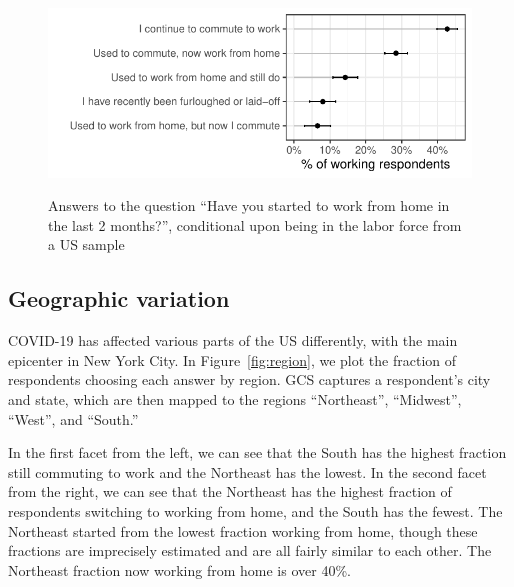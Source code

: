\documentclass[12pt]{article}
\begin{document}
\begin{figure}
  \caption{Answers to the question ``Have you started to work from home in the last 2 months?'', conditional upon being in the labor force from a US sample} \label{fig:working_summary}
\centering
\begin{minipage}{1.1 \linewidth}
  \includegraphics[width = \linewidth]{plots/working_summary.pdf} \\
  \begin{footnotesize}
    \end{footnotesize}
\end{minipage}
\end{figure} 

\subsection{Geographic variation} 
COVID-19 has affected various parts of the US differently, with the main epicenter in New York City.
In Figure~\ref{fig:region}, we plot the fraction of respondents choosing each answer by region.
GCS captures a respondent's city and state, which are then mapped to the regions ``Northeast'', ``Midwest'', ``West'', and ``South.'' 

In the first facet from the left, we can see that the South has the highest fraction still commuting to work and the Northeast has the lowest. 
In the second facet from the right, we can see that the Northeast has the highest fraction of respondents switching to working from home, and the South has the fewest.
The Northeast started from the lowest fraction working from home, though these fractions are imprecisely estimated and are all fairly similar to each other. 
The Northeast fraction now working from home is over 40\%. 
\end{document}

